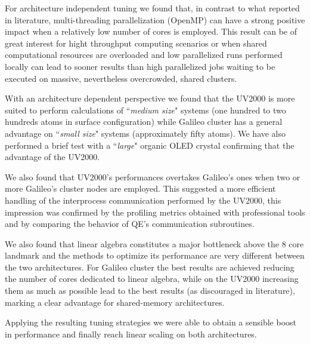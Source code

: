 \documentclass[a4paper,10pt]{article}
\begin{document}
For architecture independent tuning we found that, in contrast to what reported in literature, multi-threading parallelization (OpenMP) can have a strong positive impact when a relatively low number of cores is employed.
This result can be of great interest for hight throughput computing scenarios or when shared computational resources are overloaded and low parallelized runs performed locally can lead to sooner results than high parallelized jobs waiting to be executed on massive, nevertheless overcrowded, shared clusters.

With an architecture dependent perspective we found that the UV2000 is more suited to perform calculations of ``\textit{medium size}" systems\cite{Titania1}\cite{prace} (one hundred to two hundreds atoms in surface configuration) while Galileo cluster has a general advantage on ``\textit{small size}" systems (approximately fifty atoms).
We have also performed a brief test with a ``\textit{large}" organic OLED crystal confirming that the advantage of the UV2000.

We also found that UV2000's performances overtakes Galileo's ones when two or more Galileo's cluster nodes are employed.
This suggested a more efficient handling of the interprocess communication performed by the UV2000, this impression was confirmed by the profiling metrics obtained with professional tools and by comparing the behavior of QE's communication subroutines.

We also found that linear algebra constitutes a major bottleneck above the 8 core landmark and the methods to optimize its performance are very different between the two architectures.
For Galileo cluster the best results are achieved reducing the number of cores dedicated to linear algebra, while on the UV2000 increasing them as much as possible lead to the best results (as discouraged in literature\cite{QE2}), marking a clear advantage for shared-memory architectures.

Applying the resulting tuning strategies we were able to obtain a sensible boost in performance and finally reach linear scaling on both architectures.
\end{document}
